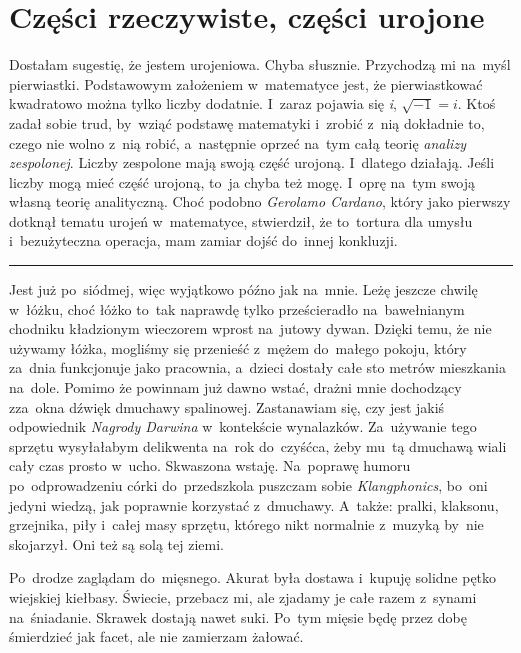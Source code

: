 \documentclass[9pt, a5paper]{memoir}
\begin{document}
\newpage
\section{Części rzeczywiste, części urojone}
Dostałam sugestię, że jestem urojeniowa. Chyba słusznie. Przychodzą mi na~myśl pierwiastki. Podstawowym założeniem w~matematyce jest, że pierwiastkować kwadratowo można tylko liczby dodatnie. I~zaraz pojawia się \textit{i}, $\sqrt{-1} = i$. Ktoś zadał sobie trud, by~wziąć podstawę matematyki i~zrobić z~nią dokładnie to, czego nie wolno z~nią robić, a~następnie oprzeć na~tym całą teorię \textit{analizy zespolonej}. Liczby zespolone mają swoją część urojoną. I~dlatego działają. Jeśli liczby mogą mieć część urojoną, to~ja chyba też mogę. I~oprę na~tym swoją własną teorię analityczną. Choć podobno \textit{Gerolamo Cardano}, który jako pierwszy dotknął tematu urojeń w~matematyce, stwierdził, że to~tortura dla umysłu i~bezużyteczna operacja, mam zamiar dojść do~innej konkluzji.

\fancybreak{* \quad * \quad *}

Jest już po~siódmej, więc wyjątkowo późno jak na~mnie. Leżę jeszcze chwilę w~łóżku, choć łóżko to~tak naprawdę tylko prześcieradło na~bawełnianym chodniku kładzionym wieczorem wprost na~jutowy dywan. Dzięki temu, że nie używamy łóżka, mogliśmy się przenieść z~mężem do~małego pokoju, który za~dnia funkcjonuje jako pracownia, a~dzieci dostały całe sto metrów mieszkania na~dole. Pomimo że powinnam już dawno wstać, drażni mnie dochodzący zza~okna dźwięk dmuchawy spalinowej. Zastanawiam się, czy jest jakiś odpowiednik \textit{Nagrody Darwina} w~kontekście wynalazków. Za~używanie tego sprzętu wysyłałabym delikwenta na~rok do~czyśćca, żeby mu~tą dmuchawą wiali cały czas prosto w~ucho. Skwaszona wstaję. Na~poprawę humoru po~odprowadzeniu córki do~przedszkola puszczam sobie \textit{Klangphonics}, bo~oni jedyni wiedzą, jak poprawnie korzystać z~dmuchawy. A~także: pralki, klaksonu, grzejnika, piły i~całej masy sprzętu, którego nikt normalnie z~muzyką by~nie skojarzył. Oni też są solą tej ziemi.

Po~drodze zaglądam do~mięsnego. Akurat była dostawa i~kupuję solidne pętko wiejskiej kiełbasy. Świecie, przebacz mi, ale zjadamy je całe razem z~synami na~śniadanie. Skrawek dostają nawet suki. Po~tym mięsie będę przez dobę śmierdzieć jak facet, ale nie zamierzam żałować.
\end{document}
